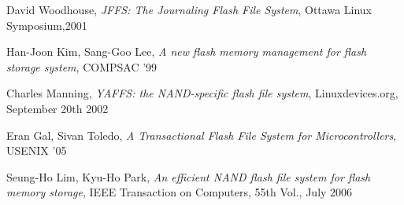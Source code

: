 \documentclass[conference]{IEEEtran}
\begin{document}















%
%
%
\begin{thebibliography}{1}

David Woodhouse, \emph{JFFS: The Journaling Flash File System},
Ottawa Linux Symposium,2001

Han-Joon Kim, Sang-Goo Lee, \emph{A new flash memory management
for flash storage system}, COMPSAC '99

Charles Manning, \emph{YAFFS: the NAND-specific flash file system},
Linuxdevices.org, September 20th 2002

Eran Gal, Sivan Toledo, \emph{A Transactional Flash File System for
Microcontrollers}, USENIX '05

Seung-Ho Lim, Kyu-Ho Park, \emph{An efficient NAND flash file
system for flash memory storage}, IEEE Transaction on Computers, 55th Vol.,
July 2006

\end{thebibliography}




\end{document}
